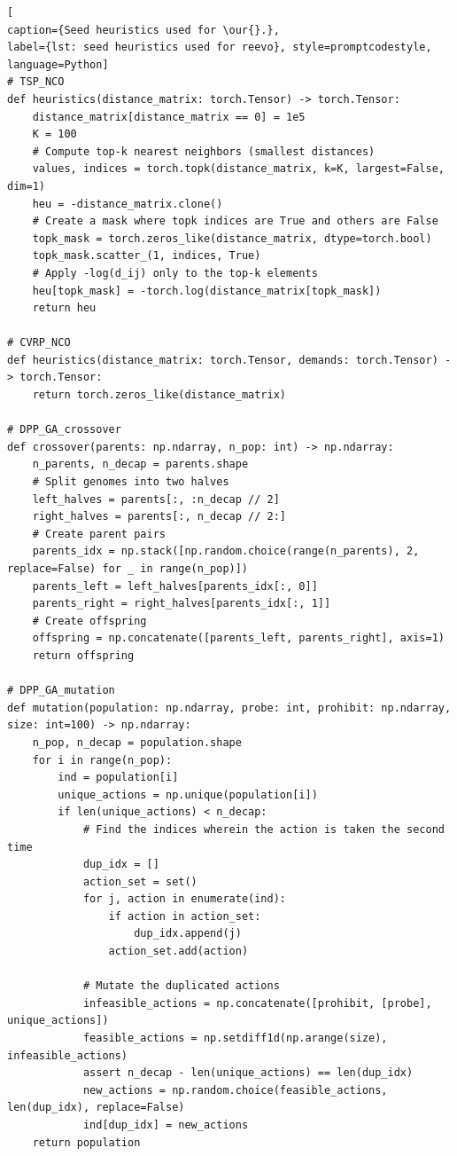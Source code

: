 \begin{lstlisting}[
caption={Seed heuristics used for \our{}.},
label={lst: seed heuristics used for reevo}, style=promptcodestyle, language=Python]
# TSP_NCO
def heuristics(distance_matrix: torch.Tensor) -> torch.Tensor:
    distance_matrix[distance_matrix == 0] = 1e5
    K = 100
    # Compute top-k nearest neighbors (smallest distances)
    values, indices = torch.topk(distance_matrix, k=K, largest=False, dim=1)
    heu = -distance_matrix.clone()
    # Create a mask where topk indices are True and others are False
    topk_mask = torch.zeros_like(distance_matrix, dtype=torch.bool)
    topk_mask.scatter_(1, indices, True)
    # Apply -log(d_ij) only to the top-k elements
    heu[topk_mask] = -torch.log(distance_matrix[topk_mask])
    return heu

# CVRP_NCO
def heuristics(distance_matrix: torch.Tensor, demands: torch.Tensor) -> torch.Tensor:
    return torch.zeros_like(distance_matrix)

# DPP_GA_crossover
def crossover(parents: np.ndarray, n_pop: int) -> np.ndarray:
    n_parents, n_decap = parents.shape
    # Split genomes into two halves
    left_halves = parents[:, :n_decap // 2]
    right_halves = parents[:, n_decap // 2:]
    # Create parent pairs
    parents_idx = np.stack([np.random.choice(range(n_parents), 2, replace=False) for _ in range(n_pop)])
    parents_left = left_halves[parents_idx[:, 0]]
    parents_right = right_halves[parents_idx[:, 1]]
    # Create offspring
    offspring = np.concatenate([parents_left, parents_right], axis=1)
    return offspring

# DPP_GA_mutation
def mutation(population: np.ndarray, probe: int, prohibit: np.ndarray, size: int=100) -> np.ndarray:
    n_pop, n_decap = population.shape
    for i in range(n_pop):
        ind = population[i]
        unique_actions = np.unique(population[i])
        if len(unique_actions) < n_decap:
            # Find the indices wherein the action is taken the second time
            dup_idx = []
            action_set = set()
            for j, action in enumerate(ind):
                if action in action_set:
                    dup_idx.append(j)
                action_set.add(action)

            # Mutate the duplicated actions
            infeasible_actions = np.concatenate([prohibit, [probe], unique_actions])
            feasible_actions = np.setdiff1d(np.arange(size), infeasible_actions)
            assert n_decap - len(unique_actions) == len(dup_idx)
            new_actions = np.random.choice(feasible_actions, len(dup_idx), replace=False)
            ind[dup_idx] = new_actions
    return population


\end{lstlisting}
